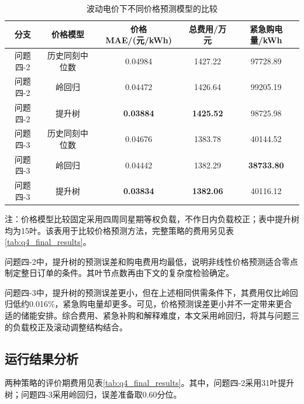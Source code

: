 \begin{table}[!htbp]
    \centering
    \caption{波动电价下不同价格预测模型的比较}
    \label{tab:q4_price_comparison}
    \begin{tabular}{ccccc}
        \hline
        分支 & 价格模型 & 价格MAE/(元/kWh) & 总费用/万元 & 紧急购电量/kWh \\
        \hline
        问题四-2 & 历史同刻中位数 & 0.04984 & 1427.22 & 97728.89 \\
        问题四-2 & 岭回归 & 0.04472 & 1426.64 & 99205.19 \\
        问题四-2 & 提升树 & \textbf{0.03884} & \textbf{1425.52} & 98725.98 \\
        \hline
        问题四-3 & 历史同刻中位数 & 0.04676 & 1383.78 & 40144.52 \\
        问题四-3 & 岭回归 & 0.04442 & 1382.29 & \textbf{38733.80} \\
        问题四-3 & 提升树 & \textbf{0.03834} & \textbf{1382.06} & 40116.12 \\
        \hline
    \end{tabular}
    \par\smallskip
    \begin{minipage}{0.96\textwidth}
    \small 注：价格模型比较固定采用四周同星期等权负载，不作日内负载校正；表中提升树均为15叶。该表用于比较价格预测方法，完整策略的费用另见表\ref{tab:q4_final_results}。
    \end{minipage}
\end{table}

问题四-2中，提升树的预测误差和购电费用均最低，说明非线性价格预测适合零点制定整日订单的条件。其叶节点数再由下文的复杂度检验确定。

问题四-3中，提升树的预测误差更小，但在上述相同供需条件下，其费用仅比岭回归低约0.016\%，紧急购电量却更多。可见，价格预测误差更小并不一定带来更合适的储能安排。综合费用、紧急补购和解释难度，本文采用岭回归，将其与问题三的负载校正及滚动调整结构结合。

\subsection{运行结果分析}

两种策略的评价期费用见表\ref{tab:q4_final_results}。其中，问题四-2采用31叶提升树；问题四-3采用岭回归，误差准备取0.60分位。

